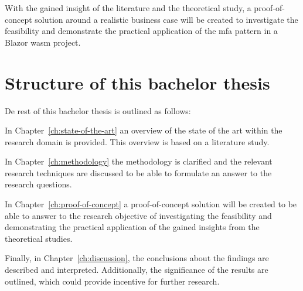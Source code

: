 With the gained insight of the literature and the theoretical study, a
proof-of-concept solution around a realistic business case will be created to
investigate the feasibility and demonstrate the practical application of the
\gls{mfa} pattern in a Blazor \gls{wasm} project. 


\section{Structure of this bachelor thesis}
\label{sec:structure}


De rest of this bachelor thesis is outlined as follows:

In Chapter~\ref{ch:state-of-the-art} an overview of the state of the art within
the research domain is provided. This overview is based on a literature study.

In Chapter~\ref{ch:methodology} the methodology is clarified and the relevant
research techniques are discussed to be able to formulate an answer to the
research questions.

In Chapter~\ref{ch:proof-of-concept} a proof-of-concept solution will be created
to be able to answer to the research objective of investigating the feasibility
and demonstrating the practical application of the gained insights from the
theoretical studies. 

Finally, in Chapter~\ref{ch:discussion}, the conclusions about the findings are
described and interpreted. Additionally, the significance of the results are
outlined, which could provide incentive for further research.